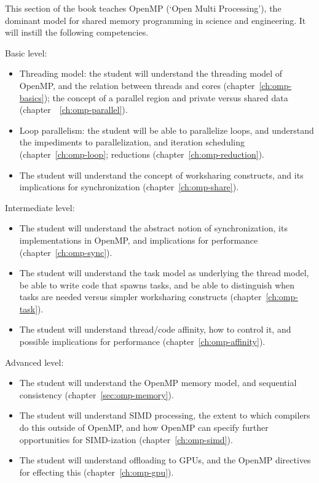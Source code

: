 
This section of the book teaches OpenMP (`Open Multi Processing'),
the dominant model for shared memory programming in science and engineering.
It will instill the following competencies.

Basic level:
\begin{itemize}
\item Threading model: the student will understand the threading model of OpenMP,
  and the relation between threads and cores (chapter~\ref{ch:omp-basics});
  the concept of a parallel region and private versus shared data
  (chapter~~\ref{ch:omp-parallel}).
\item Loop parallelism: the student will be able to parallelize loops,
  and understand the impediments to parallelization, and
  iteration scheduling (chapter~\ref{ch:omp-loop};
  reductions (chapter~\ref{ch:omp-reduction}).
\item The student will understand the concept of worksharing constructs,
  and its implications for synchronization (chapter~\ref{ch:omp-share}).
\end{itemize}

Intermediate level:
\begin{itemize}
\item The student will understand the abstract notion of synchronization,
  its implementations in OpenMP, and implications for performance
  (chapter~\ref{ch:omp-sync}).
\item The student will understand the task model as underlying the thread model,
  be able to write code that spawns tasks, and be able to distinguish
  when tasks are needed versus simpler worksharing constructs
  (chapter~\ref{ch:omp-task}).
\item The student will understand thread/code affinity, how to control it,
  and possible implications for performance (chapter~\ref{ch:omp-affinity}).
\end{itemize}

Advanced level:
\begin{itemize}
\item The student will understand the OpenMP memory model,
  and sequential consistency (chapter~\ref{sec:omp-memory}).
\item The student will understand \acs{SIMD} processing, the extent to which
  compilers do this outside of OpenMP,
  and how OpenMP can specify further opportunities for SIMD-ization
  (chapter~\ref{ch:omp-simd}).
\item The student will understand offloading to \acp{GPU},
  and the OpenMP directives for effecting this (chapter~\ref{ch:omp-gpu}).
\end{itemize}
